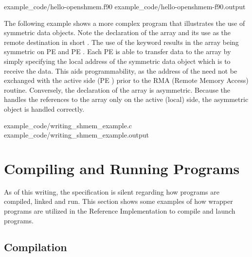 \begin{minipage}{\linewidth}
\vspace{0.1in}
                {example_code/hello-openshmem.f90}
                {example_code/hello-openshmem-f90.output}
\vspace{0.1in}
\end{minipage}

The following example shows a more complex \openshmem program that illustrates
the use of symmetric data objects.  Note the declaration of the   array and its use as the remote destination in \openshmem short
\PUT.  The use of the  keyword results in the  array being
symmetric on \ac{PE}  and \ac{PE} .  Each \ac{PE} is able to
transfer data to the \dest{} array by simply specifying the local address of the
symmetric data object which is to receive the data.  This aids programmability,
as the address of the \dest{} need not be exchanged with the active side
(\ac{PE} ) prior to the RMA (Remote Memory Access) routine.
Conversely, the declaration of the  array is asymmetric.
Because the \PUT{} handles the references to the  array only on the
active (local) side, the asymmetric \source{} object is handled correctly.

\begin{minipage}{\linewidth}
\vspace{0.1in}
                {example_code/writing_shmem_example.c}
                {example_code/writing_shmem_example.output}
\vspace{0.1in}
\end{minipage}




\chapter{Compiling and Running Programs}\label{sec:compiling}
As of this writing, the \openshmem{} specification is silent regarding how
\openshmem{} programs are compiled, linked and run. This section shows some
examples of how wrapper programs are utilized in the \openshmem{} Reference
Implementation to compile and launch programs.

\section{Compilation}
